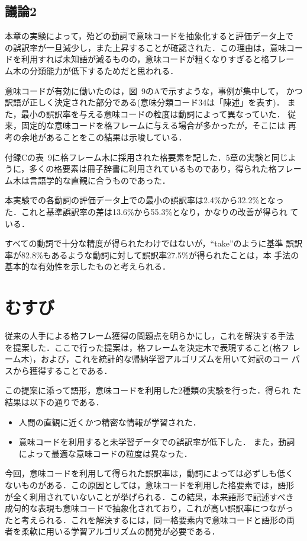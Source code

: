 \subsection{議論2}

本章の実験によって，殆どの動詞で意味コードを抽象化すると評価データ上で
の誤訳率が一旦減少し，また上昇することが確認された．この理由は，意味コー
ドを利用すれば未知語が減るものの，意味コードが粗くなりすぎると格フレー
ム木の分類能力が低下するためだと思われる．

意味コードが有効に働いたのは，図~9のAで示すような，事例が集中して，
かつ訳語が正しく決定された部分である(意味分類コード34は「陳述」を表す)．
また，最小の誤訳率を与える意味コードの粒度は動詞によって異なっていた．
従来，固定的な意味コードを格フレームに与える場合が多かったが，そこには
再考の余地があることをこの結果は示唆している．

付録Cの表~9に格フレーム木に採用された格要素を記した．5章の実験と同じよ
うに，多くの格要素は冊子辞書に利用されているものであり，得られた格フレー
ム木は言語学的な直観に合うものであった．

本実験での各動詞の評価データ上での最小の誤訳率は2.4\%から32.2\%となっ
た．これと基準誤訳率の差は13.6\%から55.3\%となり，かなりの改善が得られ
ている．

すべての動詞で十分な精度が得られたわけではないが，``take''のように基準
誤訳率が82.8\%もあるような動詞に対して誤訳率27.5\%が得られたことは，本
手法の基本的な有効性を示したものと考えられる．

\section{むすび}

従来の人手による格フレーム獲得の問題点を明らかにし，これを解決する手法
を提案した．ここで行った提案は，格フレームを決定木で表現すること(格フ
レーム木)，および，これを統計的な帰納学習アルゴリズムを用いて対訳のコー
パスから獲得することである．

この提案に添って語形，意味コードを利用した2種類の実験を行った．得られ
た結果は以下の通りである．
\begin{itemize}
\item 人間の直観に近くかつ精密な情報が学習された．
\item 意味コードを利用すると未学習データでの誤訳率が低下した．
また，動詞によって最適な意味コードの粒度は異なった．
\end{itemize}
今回，意味コードを利用して得られた誤訳率は，動詞によっては必ずしも低く
ないものがある．この原因としては，意味コードを利用した格要素では，語形
が全く利用されていないことが挙げられる．この結果，本来語形で記述すべき
成句的な表現も意味コードで抽象化されており，これが高い誤訳率につながっ
たと考えられる．これを解決するには，同一格要素内で意味コードと語形の両
者を柔軟に用いる学習アルゴリズムの開発が必要である．

